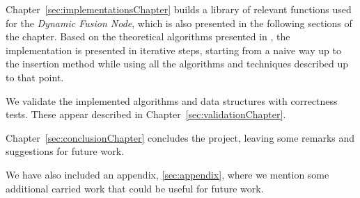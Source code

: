 Chapter~\ref{sec:implementationsChapter} builds a library of relevant functions used for the \textit{Dynamic Fusion Node}, which is also presented in the following sections of the chapter.
Based on the theoretical algorithms presented in \cite{patrascu2014dynamic}, the implementation is presented in iterative steps, starting from a naive way up to the insertion method while using all the algorithms and techniques described up to that point.

We validate the implemented algorithms and data structures with correctness tests. These appear described in Chapter~\ref{sec:validationChapter}.

Chapter~\ref{sec:conclusionChapter} concludes the project, leaving some remarks and suggestions for future work.

We have also included an appendix, \ref{sec:appendix}, where we mention some additional carried work that could be useful for future work.

